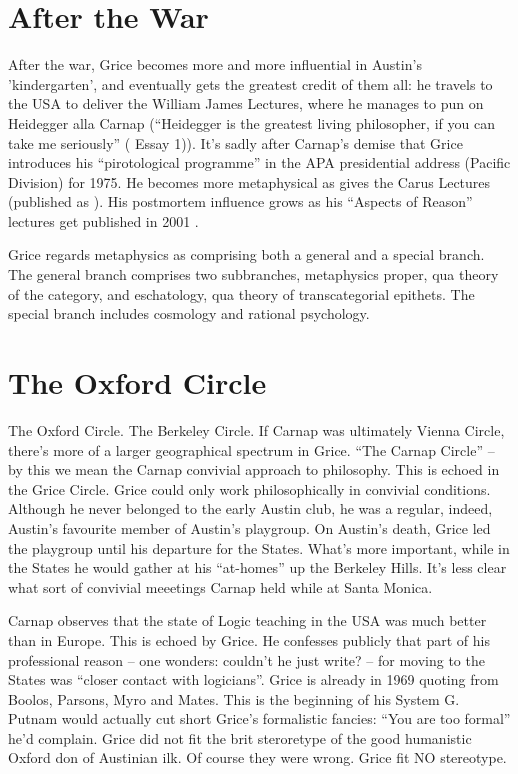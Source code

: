 \documentclass[10pt,titlepage]{book}
\begin{document}
{\section{After the War}

After the war, Grice becomes more and more influential in Austin's  'kindergarten', and eventually gets the greatest credit of them all: he travels to the USA to deliver the William James Lectures, where he manages to pun on Heidegger alla Carnap (``Heidegger is the greatest living philosopher, if you can take me seriously''  (\cite{grice89} Essay 1)).
It’s sadly after Carnap’s demise that Grice introduces his ``pirotological programme'' in the APA presidential address (Pacific Division) for 1975.
He becomes more metaphysical as gives the Carus Lectures (published as \cite{grice91}).
His postmortem influence grows as his ``Aspects of Reason'' lectures get published in 2001 \cite{grice01}. 

Grice  regards metaphysics as comprising both a general and a special branch.
The general branch comprises two subbranches, metaphysics proper, qua theory of the category, and eschatology, qua theory of transcategorial 
epithets.
The special branch includes cosmology and rational psychology.  

\section{The Oxford Circle}

The  Oxford Circle. The Berkeley Circle.
If Carnap was ultimately Vienna Circle, there’s more of a larger geographical spectrum in Grice.
``The Carnap Circle'' --  by this we mean the Carnap convivial approach to philosophy. 
This is echoed in  the Grice Circle.
Grice could only work philosophically in convivial conditions.
Although he never belonged to the early Austin club, he was a regular, indeed, Austin's favourite member of Austin's playgroup. 
On Austin's death, Grice led the playgroup until his departure for the States.
What's more important, while in the States he would gather at his ``at-homes'' up the Berkeley Hills.
It's less clear what sort of convivial meeetings Carnap held while at Santa Monica. 

Carnap observes that the state of Logic teaching in the USA was much better than in Europe.
This is echoed by Grice.
He confesses publicly that part of his  professional reason -- one wonders: couldn't he just write? -- for moving to the States was ``closer contact with logicians''.
Grice is already in 1969 quoting from Boolos, Parsons, Myro and Mates.
This is the beginning of his System G.
Putnam would actually cut short Grice's formalistic fancies: ``You are too formal'' he'd complain.
Grice did not fit the brit steroretype of the good humanistic Oxford don of Austinian ilk.
Of course they were wrong.
Grice fit NO stereotype.

}
\end{document}

